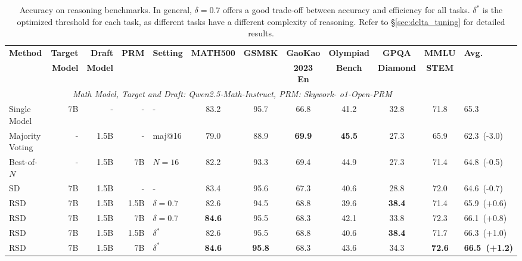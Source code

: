 \documentclass{article}
\theoremstyle{plain}
\theoremstyle{definition}
\theoremstyle{remark}
\begin{document}
\begin{table}[h!]
\caption{Accuracy on reasoning benchmarks. In general, $\delta=0.7$ offers a good trade-off between accuracy and efficiency for all tasks. $\delta^*$ is the optimized threshold for each task, as different tasks have a different complexity of reasoning. Refer to \S\ref{sec:delta_tuning} for detailed results.}
\label{tab:main results}
\vskip 0.1in
\scriptsize
\begin{center}
\begin{tabular}{lrrrlccccccl}
\toprule
\multirow{2}{*}{\textbf{Method}} & \textbf{Target} & \textbf{Draft} & \multirow{2}{*}{\textbf{PRM}} & \multirow{2}{*}{\textbf{Setting}} & \multirow{2}{*}{\textbf{MATH500}} & \multirow{2}{*}{\textbf{GSM8K}} & \textbf{GaoKao} &  \textbf{Olympiad} &  \textbf{GPQA} &  \textbf{MMLU} & \multirow{2}{*}{\textbf{Avg.}} \\
& \textbf{Model} & \textbf{Model} & & & & & \textbf{2023 En} &  \textbf{Bench} &  \textbf{Diamond} &  \textbf{STEM} \\
\midrule
\multicolumn{11}{c}{\textit{Math Model, Target and Draft: Qwen2.5-Math-Instruct, PRM: Skywork-
o1-Open-PRM}} \\
\midrule
Single Model & 7B & - & - & - & 83.2 & 95.7 & 66.8 & 41.2 & 32.8 & 71.8 & 65.3 \\
\cmidrule(lr){1-12}
Majority Voting & - & 1.5B & - & maj@16 & 79.0 & 88.9 & \textbf{69.9} & \textbf{45.5} & 27.3 & 65.9 & 62.3~(-3.0) \\
Best-of-$N$ & - & 1.5B & 7B & $N=16$ & 82.2 & 93.3 & 69.4 & 44.9 & 27.3 & 71.4 & 64.8~(-0.5) \\ %
SD & 7B & 1.5B & - & - & 83.4 & 95.6 & 67.3 & 40.6 & 28.8 & 72.0 & 64.6~(-0.7) \\
\rowcolor{blue!8}
RSD & 7B & 1.5B & 1.5B & $\delta=0.7$ & 82.6 & 94.5 & 68.8 & 39.6 & \textbf{38.4} & 71.4 & 65.9~(+0.6) \\
\rowcolor{blue!8}
RSD & 7B & 1.5B & 7B & $\delta=0.7$ & \textbf{84.6} & 95.5 & 68.3 & 42.1 & 33.8 & 72.3 & 66.1~(+0.8) \\
\rowcolor{orange!8}
RSD & 7B & 1.5B & 1.5B & $\delta^*$ & 82.6 & 95.5 & 68.8 & 40.6 & \textbf{38.4} & 71.7 & 66.3~(+1.0) \\
\rowcolor{orange!8}
RSD & 7B & 1.5B & 7B & $\delta^*$ & \textbf{84.6} & \textbf{95.8} & 68.3 & 43.6 & 34.3 & \textbf{72.6} & \textbf{66.5~(+1.2)} \\

\end{tabular}
\end{center}
\end{table}
\end{document}
